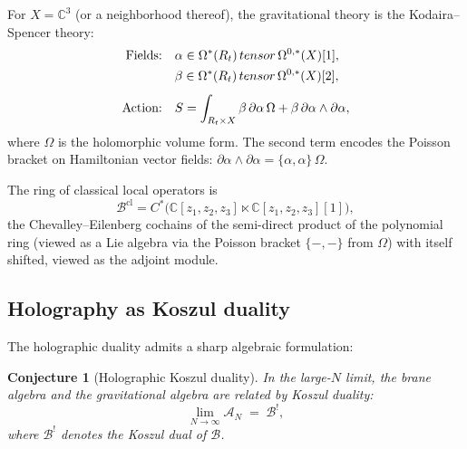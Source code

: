 \documentclass[11pt]{article}
\newtheorem{conjecture}[theorem]{Conjecture}
\theoremstyle{definition}
\theoremstyle{remark}
\newcommand{\cA}{\mathcal{A}}
\newcommand{\cB}{\mathcal{B}}
\begin{document}
For $X = \mathbb{C}^3$ (or a neighborhood thereof), the gravitational theory is
the Kodaira--Spencer theory:
\begin{align}
 \text{Fields:} \quad
 &\alpha \in \Omega^*(\mathbb{R}_t) \,\hat{\otimes}\,
 \Omega^{0,*}(X)[1], \notag \\
 &\beta \in \Omega^*(\mathbb{R}_t) \,\hat{\otimes}\,
 \Omega^{0,*}(X)[2], \notag \\[4pt]
 \text{Action:} \quad
 &S = \int_{\mathbb{R}_t \times X}
 \beta \, \bar{\partial} \alpha \, \Omega
 + \beta \, \partial\alpha \wedge \partial\alpha, \label{eq:ks-action}
\end{align}
where $\Omega$ is the holomorphic volume form. The second term encodes the
Poisson bracket on Hamiltonian vector fields: $\partial\alpha \wedge
\partial\alpha = \{\alpha, \alpha\} \, \Omega$.

The ring of classical local operators is
\[
 \cB^{\mathrm{cl}} = C^*\bigl(
 \mathbb{C}[z_1, z_2, z_3] \ltimes \mathbb{C}[z_1, z_2, z_3][1]
 \bigr),
\]
the Chevalley--Eilenberg cochains of the semi-direct product of the polynomial
ring (viewed as a Lie algebra via the Poisson bracket $\{-,-\}$ from $\Omega$)
with itself shifted, viewed as the adjoint module.

\subsection{Holography as Koszul duality}
\label{sec:holography-koszul}

The holographic duality admits a sharp algebraic formulation:

\begin{conjecture}[Holographic Koszul duality]
\label{conj:holographic-kd}
In the large-$N$ limit, the brane algebra and the gravitational algebra are
related by Koszul duality:
\[
 \lim_{N \to \infty} \cA_N \;=\; \cB^{!},
\]
where $\cB^!$ denotes the Koszul dual of $\cB$.
\end{conjecture}
\end{document}
